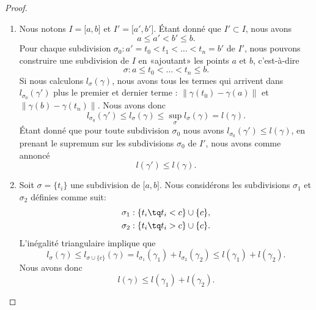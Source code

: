 \begin{proof}
	\begin{enumerate}
		\item
		      Nous notons \( I=\mathopen[ a , b \mathclose]\) et \( I'=\mathopen[ a' , b' \mathclose]\). Étant donné que \( I'\subset I\), nous avons
		      \begin{equation}
			      a\leq a'<b'\leq b.
		      \end{equation}
		      Pour chaque subdivision \( \sigma_0:a'=t_0<t_1<\ldots<t_n=b'\) de \( I'\), nous pouvons construire une subdivision de \( I\) en «ajoutant» les points \( a\) et \( b\), c'est-à-dire
		      \begin{equation}
			      \sigma:a\leq t_0<\ldots<t_n\leq b.
		      \end{equation}
		      Si nous calculons \( l_{\sigma}(\gamma)\), nous avons tous les termes qui arrivent dans \( l_{\sigma_0}(\gamma')\) plus le premier et dernier terme : \( \| \gamma(t_0)-\gamma(a) \|\) et \( \| \gamma(b)-\gamma(t_n)\|\). Nous avons donc
		      \begin{equation}
			      l_{\sigma_0}(\gamma')\leq l_{\sigma}(\gamma)\leq\sup_{\sigma}l_{\sigma}(\gamma)=l(\gamma).
		      \end{equation}
		      Étant donné que pour toute subdivision \( \sigma_0\) nous avons \( l_{\sigma_0}(\gamma')\leq l(\gamma)\), en prenant le supremum sur les subdivisions \( \sigma_0\) de \( I'\), nous avons comme annoncé
		      \begin{equation}
			      l(\gamma')\leq l(\gamma).
		      \end{equation}
		\item
		      Soit \( \sigma=\{ t_i \}\) une subdivision de \( \mathopen[ a , b \mathclose]\). Nous considérons les subdivisions \( \sigma_1\) et \( \sigma_2\) définies comme suit:
		      \begin{equation}
			      \begin{aligned}[]
				      \sigma_1 & :\{ t_i\tq t_i< c \}\cup\{ c \}, \\
				      \sigma_2 & :\{ t_i\tq t_i> c \}\cup\{ c \}.
			      \end{aligned}
		      \end{equation}
		      L'inégalité triangulaire implique que
		      \begin{equation}
			      l_{\sigma}(\gamma)\leq l_{\sigma\cup\{ c \}}(\gamma)=l_{\sigma_1}(\gamma_1)+l_{\sigma_2}(\gamma_2)\leq l(\gamma_1)+l(\gamma_2).
		      \end{equation}
		      Nous avons donc
		      \begin{equation}    \label{EqIneglglglgud}
			      l(\gamma)\leq l(\gamma_1)+l(\gamma_2).
		      \end{equation}


\end{enumerate}
\end{proof}
